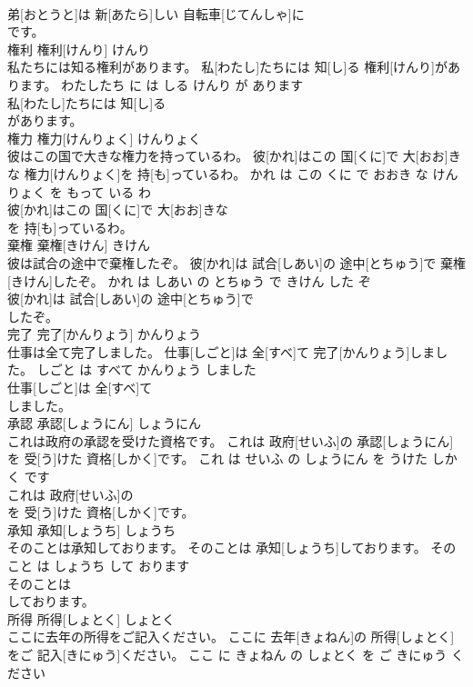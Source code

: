 \documentclass[8pt]{extreport}
\begin{document}
\begin{CJK}{UTF8}{min}
\\	弟[おとうと]は 新[あたら]しい 自転車[じてんしゃ]に
\\	です。			
\\	権利	権利[けんり]	けんり	
\\	私たちには知る権利があります。	私[わたし]たちには 知[し]る 権利[けんり]があります。	わたしたち に は しる けんり が あります	
\\	私[わたし]たちには 知[し]る
\\	があります。			
\\	権力	権力[けんりょく]	けんりょく	
\\	彼はこの国で大きな権力を持っているわ。	彼[かれ]はこの 国[くに]で 大[おお]きな 権力[けんりょく]を 持[も]っているわ。	かれ は この くに で おおき な けんりょく を もって いる わ	
\\	彼[かれ]はこの 国[くに]で 大[おお]きな
\\	を 持[も]っているわ。			
\\	棄権	棄権[きけん]	きけん	
\\	彼は試合の途中で棄権したぞ。	彼[かれ]は 試合[しあい]の 途中[とちゅう]で 棄権[きけん]したぞ。	かれ は しあい の とちゅう で きけん した ぞ	
\\	彼[かれ]は 試合[しあい]の 途中[とちゅう]で
\\	したぞ。			
\\	完了	完了[かんりょう]	かんりょう	
\\	仕事は全て完了しました。	仕事[しごと]は 全[すべ]て 完了[かんりょう]しました。	しごと は すべて かんりょう しました	
\\	仕事[しごと]は 全[すべ]て
\\	しました。			
\\	承認	承認[しょうにん]	しょうにん	
\\	これは政府の承認を受けた資格です。	これは 政府[せいふ]の 承認[しょうにん]を 受[う]けた 資格[しかく]です。	これ は せいふ の しょうにん を うけた しかく です	
\\	これは 政府[せいふ]の
\\	を 受[う]けた 資格[しかく]です。			
\\	承知	承知[しょうち]	しょうち	
\\	そのことは承知しております。	そのことは 承知[しょうち]しております。	その こと は しょうち して おります	
\\	そのことは
\\	しております。			
\\	所得	所得[しょとく]	しょとく	
\\	ここに去年の所得をご記入ください。	ここに 去年[きょねん]の 所得[しょとく]をご 記入[きにゅう]ください。	ここ に きょねん の しょとく を ご きにゅう ください	

\end{CJK}
\end{document}
